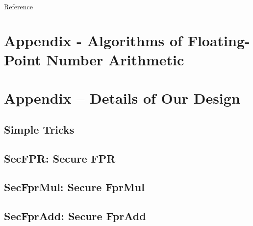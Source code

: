 \begin{frame}[allowframebreaks]{Reference}


\printbibliography[title=Reference]

\end{frame}

\appendix
\backupbegin

\section{Appendix - Algorithms of Floating-Point Number Arithmetic}
\label{sec:appendix-fpu}


\section{Appendix – Details of Our Design}
\label{sec:appendix}
\hypertarget{sec:appendix}{}

\ifhandout
\else
\subsection{Simple Tricks}

\fi

\subsection{SecFPR: Secure FPR}


\subsection{SecFprMul: Secure FprMul}


\subsection{SecFprAdd: Secure FprAdd}


\backupend

